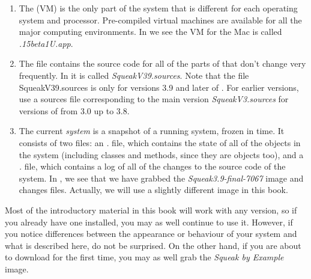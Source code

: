 \documentclass[a4paper,10pt,twoside]{book}
\begin{document}
\begin{enumerate}

  \item The  (VM) is the only part of the system that is different for each operating system and processor.  Pre-compiled virtual machines are available for all the major computing environments.  In  we see the VM for the Mac is called \textit{.15beta1U.app}.

  \item The  file contains the source code for all of the parts of \sq that don't change very frequently. In  it is called \emph{SqueakV39.sources}. Note that the file SqueakV39.sources is only for versions 3.9 and later of \sq. For earlier versions, use a sources file corresponding to the main version \eg \textit{SqueakV3.sources} for versions of \sq from 3.0 up to 3.8.

  \item The current \emph{system } is a snapshot of a running \sq system, frozen in time.  It consists of two files: an \emph{.} file, which contains the state of all of the objects in the system (including classes and methods, since they are objects too), and a \emph{.} file, which contains a log of all of the changes to the source code of the system.
In , we see that we have grabbed the \textit{Squeak3.9-final-7067} image and changes files.
Actually, we will use a slightly different image in this book.
\end{enumerate}

\label{sec:sbeImage}

Most of the introductory material in this book will work with any version, so if you already have one installed, you may as well continue to use it.
However, if you notice differences between the appearance or behaviour of your system and what is described here, do not be surprised. 
On the other hand, if you are about to download \sq for the first time, you may as well grab the \emph{Squeak by Example} image.
\end{document}
